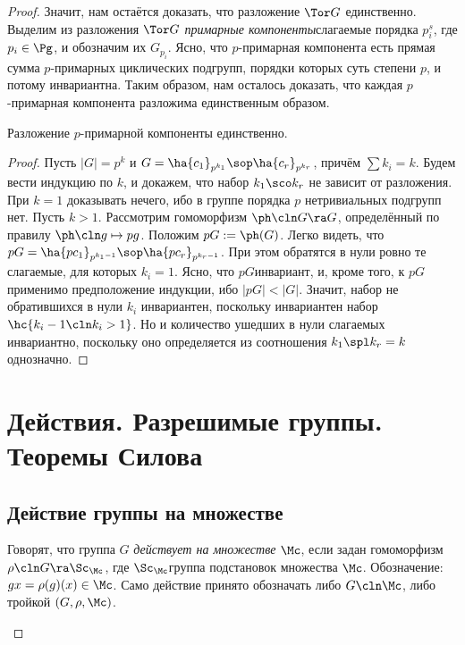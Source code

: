 \documentclass[a4paper]{article}
\begin{document}
\begin{proof}
Значит, нам остаётся доказать, что разложение $\Tor G$ единственно. Выделим  из разложения $\Tor G$
\emph{примарные компоненты}\т слагаемые порядка $p_i^s$, где $p_i \in \Pg$, и обозначим их $G_{p_i}$. Ясно,
что $p$-примарная компонента есть прямая сумма $p$-примарных циклических подгрупп, порядки которых суть
степени $p$, и потому инвариантна. Таким образом, нам осталось доказать, что каждая $p$-примарная компонента
разложима единственным образом.

\begin{theorem}[О единственности]
Разложение $p$-примарной компоненты единственно.
\end{theorem}
\begin{proof}
Пусть $|G|=p^k$ и $G=\ha{c_1}_{p^{k_1}}\sop \ha{c_r}_{p^{k_r}}$, причём  $\sum k_i = k$. Будем вести индукцию
по $k$, и докажем, что набор $k_1\sco k_r$ не зависит от разложения. При $k=1$ доказывать нечего, ибо в
группе порядка $p$ нетривиальных подгрупп нет. Пусть $k>1$. Рассмотрим гомоморфизм $\ph\cln G \ra G$,
определённый по правилу $\ph\cln g \mapsto pg$. Положим $pG := \ph(G)$. Легко видеть, что
$pG=\ha{pc_1}_{p^{k_1-1}}\sop \ha{pc_r}_{p^{k_r-1}}$. При этом обратятся в нули ровно те слагаемые, для
которых $k_i=1$. Ясно, что $pG$\т инвариант, и, кроме того, к $pG$ применимо предположение индукции, ибо
$|pG|<|G|$. Значит, набор не обратившихся в нули $k_i$ инвариантен, поскольку инвариантен набор
$\hc{k_i-1\cln k_i > 1}$. Но и количество ушедших в нули слагаемых инвариантно, поскольку оно определяется из соотношения
$k_1 \spl k_r=k$ однозначно.
\end{proof}


\section{Действия. Разрешимые группы. Теоремы Силова}

\subsection{Действие группы на множестве}

\begin{df}
Говорят, что группа $G$ \emph{действует на множестве} $\Mc$, если задан  гомоморфизм $\rho\cln G \ra
\Sc_\Mc$, где $\Sc_\Mc$\т группа подстановок множества $\Mc$. Обозначение: $gx = \rho(g)(x) \in \Mc$. Само
действие принято обозначать либо $G\cln\Mc$, либо тройкой $(G, \rho, \Mc)$.
\end{df}


\end{proof}
\end{document}
